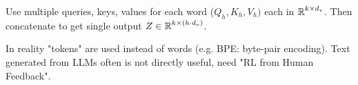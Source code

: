 \begin{definition}
  Use multiple queries, keys, values for each word (\(Q_h, K_h, V_h)\) each in \(\operatorname{\mathbb{R}}^{k \times d_v}\). Then concatenate to get single output \(Z \in \operatorname{\mathbb{R}}^{k \times (h\cdot d_v)}\).
\end{definition}

In reality "tokens" are used instead of words (e.g. BPE: byte-pair encoding). Text generated from LLMs often is not directly useful, need "RL from Human Feedback".
